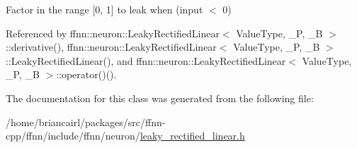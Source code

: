 Factor in the range \mbox{[}0, 1\mbox{]} to leak when (input $<$ 0) 



Referenced by ffnn\-::neuron\-::\-Leaky\-Rectified\-Linear$<$ Value\-Type, \-\_\-\-P, \-\_\-\-B $>$\-::derivative(), ffnn\-::neuron\-::\-Leaky\-Rectified\-Linear$<$ Value\-Type, \-\_\-\-P, \-\_\-\-B $>$\-::\-Leaky\-Rectified\-Linear(), and ffnn\-::neuron\-::\-Leaky\-Rectified\-Linear$<$ Value\-Type, \-\_\-\-P, \-\_\-\-B $>$\-::operator()().



The documentation for this class was generated from the following file\-:\begin{DoxyCompactItemize}
\item 
/home/briancairl/packages/src/ffnn-\/cpp/ffnn/include/ffnn/neuron/\hyperlink{leaky__rectified__linear_8h}{leaky\-\_\-rectified\-\_\-linear.\-h}\end{DoxyCompactItemize}
